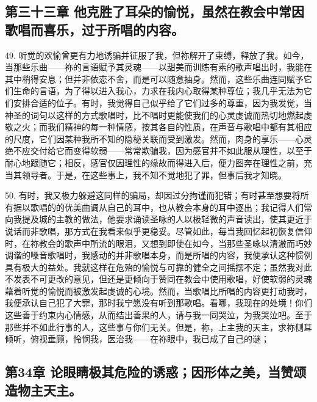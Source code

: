 
\subsection{第三十三章 他克胜了耳朵的愉悦，虽然在教会中常因歌唱而喜乐，过于所唱的内容。}

49. 听觉的欢愉曾更有力地诱骗并征服了我，但祢解开了束缚，释放了我。如今，当那些乐曲——祢的言语赋予其灵魂——以甜美而训练有素的歌声唱出时，我能在其中稍得安息；但并非依恋不舍，而是可以随意抽身。然而，这些乐曲连同赋予它们生命的言语，为了得以进入我心，力求在我内心取得某种尊位；我几乎无法为它们安排合适的位子。有时，我觉得自己似乎给了它们过多的尊重，因为我发觉，当神圣的词句以这样的方式歌唱时，比不唱时更能使我们的心灵虔诚而热切地燃起虔敬之火；而我们精神的每一种情感，按其各自的性质，在声音与歌唱中都有其相应的尺度，它们因某种我所不知的隐秘关联而受到激发。然而，肉身的享乐——心灵绝不应交付给它而变得软弱——常常欺骗我，因为感官并不如此服从理性，以至于耐心地跟随它；相反，感官仅因理性的缘故而得进入后，便力图奔在理性之前，充当其领导者。于是，在这些事上，我不知不觉地犯了罪，但事后我才知晓。\par

50. 有时，我又极力躲避这同样的骗局，却因过分拘谨而犯错；有时甚至想要将所有据以歌唱的的优美曲调从自己的耳中，也从教会本身的耳中逐出；我记得人们常向我提及城的主教的做法，他要求诵读圣咏的人以极轻微的声音读出，使其更近于说话而非歌唱，那方式在我看来似乎更稳妥。尽管如此，每当我回忆起初恢复信仰时，在祢教会的歌声中所流的眼泪，又想到即使在如今，当那些圣咏以清澈而巧妙调谐的嗓音歌唱时，我感动的并非歌唱本身，而是所唱的内容，我便承认这种惯例具有极大的益处。我就这样在危殆的愉悦与可靠的健全之间摇摆不定；虽然我对此不发表不可更改的意见，但还是更倾向于赞同在教会中使用歌唱，好使软弱的灵魂藉着听觉的愉悦而被激发起虔诚的心境。然而，当歌唱比所唱的内容更打动我时，我便承认自己犯了大罪，那时我宁愿没有听到那歌唱。看哪，我现在的处境！你们这些善于约束内心情感，从而结出善果的人，请与我一同哭泣，为我哭泣吧。至于那些并不如此行事的人，这些事与你们无关。但是，祢，上主我的天主，求祢侧耳倾听，俯视垂顾，怜悯我，医治我——在祢眼中，我已成了自己的谜；\par


\subsection{第34章 论眼睛极其危险的诱惑；因形体之美，当赞颂造物主天主。}

